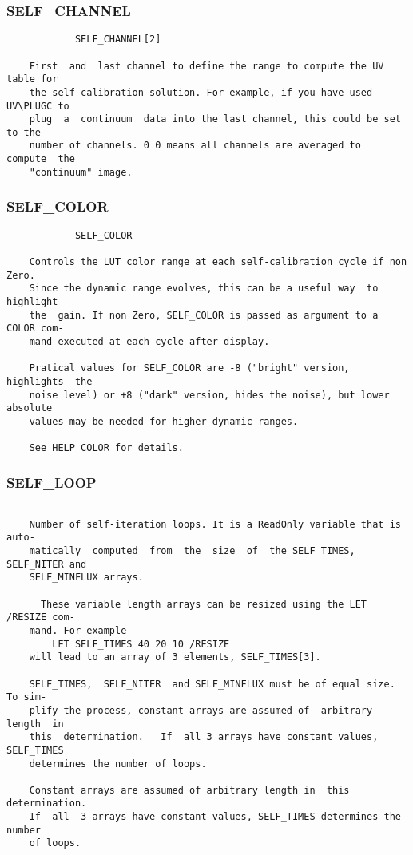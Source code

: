 \subsubsection{SELF\_CHANNEL}
\begin{verbatim}
            SELF_CHANNEL[2]

    First  and  last channel to define the range to compute the UV table for
    the self-calibration solution. For example, if you have used UV\PLUGC to
    plug  a  continuum  data into the last channel, this could be set to the
    number of channels. 0 0 means all channels are averaged to  compute  the
    "continuum" image.

\end{verbatim}
\subsubsection{SELF\_COLOR}
\begin{verbatim}
            SELF_COLOR

    Controls the LUT color range at each self-calibration cycle if non Zero.
    Since the dynamic range evolves, this can be a useful way  to  highlight
    the  gain. If non Zero, SELF_COLOR is passed as argument to a COLOR com-
    mand executed at each cycle after display.

    Pratical values for SELF_COLOR are -8 ("bright" version, highlights  the
    noise level) or +8 ("dark" version, hides the noise), but lower absolute
    values may be needed for higher dynamic ranges.

    See HELP COLOR for details.

\end{verbatim}
\subsubsection{SELF\_LOOP}
\begin{verbatim}

    Number of self-iteration loops. It is a ReadOnly variable that is  auto-
    matically  computed  from  the  size  of  the SELF_TIMES, SELF_NITER and
    SELF_MINFLUX arrays.

      These variable length arrays can be resized using the LET /RESIZE com-
    mand. For example
        LET SELF_TIMES 40 20 10 /RESIZE
    will lead to an array of 3 elements, SELF_TIMES[3].

    SELF_TIMES,  SELF_NITER  and SELF_MINFLUX must be of equal size. To sim-
    plify the process, constant arrays are assumed of  arbitrary  length  in
    this  determination.   If  all 3 arrays have constant values, SELF_TIMES
    determines the number of loops.

    Constant arrays are assumed of arbitrary length in  this  determination.
    If  all  3 arrays have constant values, SELF_TIMES determines the number
    of loops.

\end{verbatim}
